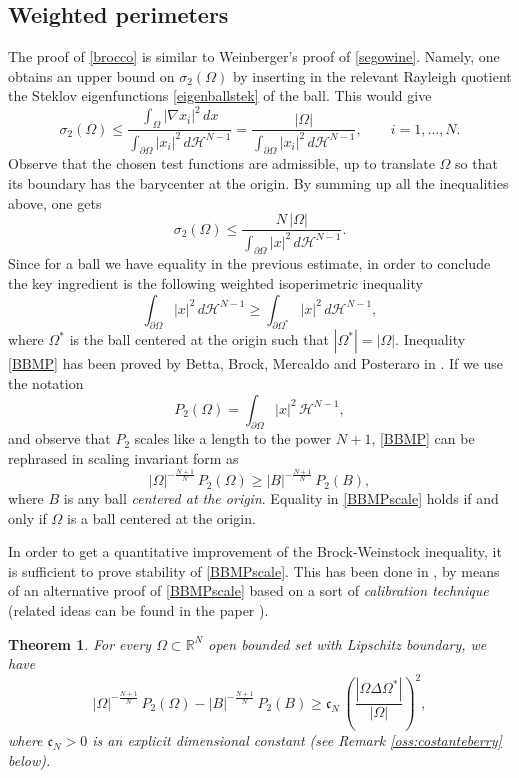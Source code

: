 \documentclass{amsart}
\newtheorem{theorem}[lemma]{Theorem}
\theoremstyle{definition}
\numberwithin{equation}{section}
\begin{document}
\subsection{Weighted perimeters}

The proof of \eqref{brocco} is similar to Weinberger's proof of \eqref{segowine}. Namely, one obtains an upper bound on $\sigma_2(\Omega)$ by inserting in the relevant Rayleigh quotient the Steklov eigenfunctions \eqref{eigenballstek} of the ball. This would give
\[
\sigma_2(\Omega)\le \frac{\displaystyle\int_\Omega |\nabla x_i|^2\, dx}{\displaystyle\int_{\partial\Omega} |x_i|^2\, d\mathcal{H}^{N-1}}=\frac{\displaystyle|\Omega|}{\displaystyle\int_{\partial\Omega} |x_i|^2\, d\mathcal{H}^{N-1}},\qquad i=1,\dots,N.
\]
Observe that the chosen test functions are admissible, up to translate $\Omega$ so that its boundary has the barycenter at the origin.
By summing up all the inequalities above, one gets 
\[
\sigma_2(\Omega)\le \frac{\displaystyle N\,|\Omega|}{\displaystyle\int_{\partial\Omega} |x|^2\, d\mathcal{H}^{N-1}}.
\]
Since for a ball we have equality in the previous estimate, in order to conclude the key ingredient is the following weighted isoperimetric inequality
\begin{equation}
\label{BBMP}
\int_{\partial\Omega} |x|^2\,d\mathcal{H}^{N-1}\ge \int_{\partial \Omega^*} |x|^2\,d\mathcal{H}^{N-1},
\end{equation}
where $\Omega^*$ is the ball centered at the origin such that $|\Omega^*|=|\Omega|$. Inequality \eqref{BBMP} has been proved by Betta, Brock, Mercaldo and Posteraro in \cite{MR1734159}. If we use the notation
\[
P_2(\Omega)=\int_{\partial \Omega} |x|^2\, \mathcal H^{N-1},
\] 
and observe that $P_2$ scales like a length to the power $N+1$, \eqref{BBMP} can be rephrased in scaling invariant form as
\begin{equation}
\label{BBMPscale}
|\Omega|^{-\frac{N+1}{N}}\,P_2(\Omega)\ge |B|^{-\frac{N+1}{N}}\,P_2(B),
\end{equation}
where $B$ is any ball {\it centered at the origin}. Equality in \eqref{BBMPscale} holds if and only if $\Omega$ is a ball centered at the origin.
\par
In order to get a quantitative improvement of the Brock-Weinstock inequality, it is sufficient to prove stability of \eqref{BBMPscale}. This has been done in \cite{MR2913683}, by means of an alternative proof of \eqref{BBMPscale} based on a sort of {\it calibration technique} (related ideas can be found in the paper \cite{MR2858470}). 
\begin{theorem}
\label{teo:bradepruf}
For every  $\Omega\subset\mathbb{R}^N$ open bounded set with Lipschitz boundary, we have 
\begin{equation}
\label{stability}
|\Omega|^{-\frac{N+1}{N}}\,P_2(\Omega)-|B|^{-\frac{N+1}{N}}\,P_2(B)\ge \mathfrak{c}_{N}\,\left(\frac{|\Omega\Delta \Omega^*|}{|\Omega|}\right)^2,
\end{equation}
where $\mathfrak{c}_{N}>0$ is an explicit dimensional constant (see Remark \ref{oss:costanteberry} below).
\end{theorem}
\end{document}
